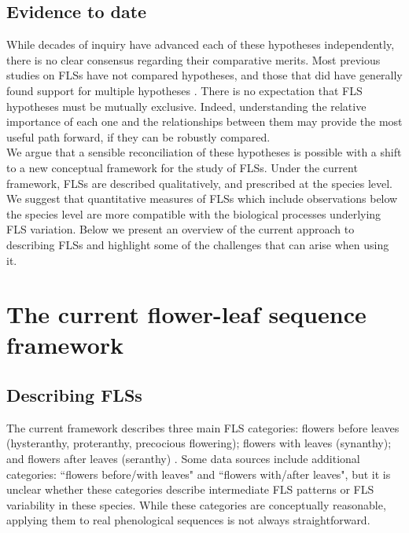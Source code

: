 \documentclass[11pt]{article}
\begin{document}
\subsection*{Evidence to date}
\noindent While decades of inquiry have advanced each of these hypotheses independently, there is no clear consensus regarding their comparative merits. Most previous studies on FLSs have not compared hypotheses, and those that did have generally found support for multiple hypotheses \citep[see][]{Bolmgren2003,Gougherty2018}. There is no expectation that FLS hypotheses must be mutually exclusive. Indeed, understanding the relative importance of each one and the relationships between them may provide the most useful path forward, if they can be robustly compared.\\

\noindent We argue that a sensible reconciliation of these hypotheses is possible with a shift to a new conceptual framework for the study of FLSs. Under the current framework, FLSs are described qualitatively, and prescribed at the species level. We suggest that quantitative measures of FLSs which include observations below the species level are more compatible with the biological processes underlying FLS variation. Below we present an overview of the current approach to describing FLSs and highlight some of the challenges that can arise when using it.\\

\section*{The current flower-leaf sequence framework}
\subsection*{Describing FLSs}
\noindent  The current framework describes three main FLS categories: flowers before leaves (hysteranthy, proteranthy, precocious flowering); flowers with leaves (synanthy); and flowers after leaves (seranthy) \citep{Lamont2011, Heinig1899}. Some data sources \citep[e.g.][]{Burns1990,Barnes2004} include additional categories: ``flowers before/with leaves" and ``flowers with/after leaves", but it is unclear whether these categories describe intermediate FLS patterns or FLS variability in these species. While these categories are conceptually reasonable, applying them to real phenological sequences is not always straightforward.\\
\end{document}
